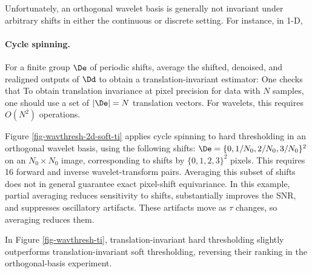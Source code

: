 Unfortunately, an orthogonal wavelet basis 
is generally not invariant under arbitrary shifts in either the continuous or discrete setting. For instance, in 1-D,

\paragraph{Cycle spinning.}

For a finite group $\De$ of periodic shifts, average the shifted, denoised, and realigned outputs of $\Dd$ to obtain a translation-invariant estimator:
One checks that
To obtain translation invariance at pixel precision for data with $N$ samples, one should use a set of $|\De|=N$ translation vectors. For wavelets, this requires $O(N^2)$ operations.

Figure \ref{fig-wavthresh-2d-soft-ti} applies cycle spinning to hard thresholding in an orthogonal wavelet basis, using the following shifts:
$\De = \{ 0, 1/N_0, 2/N_0, 3/N_0 \}^2$ on an $N_0\times N_0$ image, corresponding to shifts by $\{ 0, 1, 2, 3 \}^2$ pixels.
This requires 16 forward and inverse wavelet-transform pairs. Averaging this subset of shifts does not in general guarantee exact pixel-shift equivariance. In this example, partial averaging reduces sensitivity to shifts, substantially improves the SNR, and suppresses oscillatory artifacts. These artifacts move as $\tau$ changes, so averaging reduces them.

In Figure \ref{fig-wavthresh-ti}, translation-invariant hard thresholding slightly outperforms translation-invariant soft thresholding, reversing their ranking in the orthogonal-basis experiment. %





